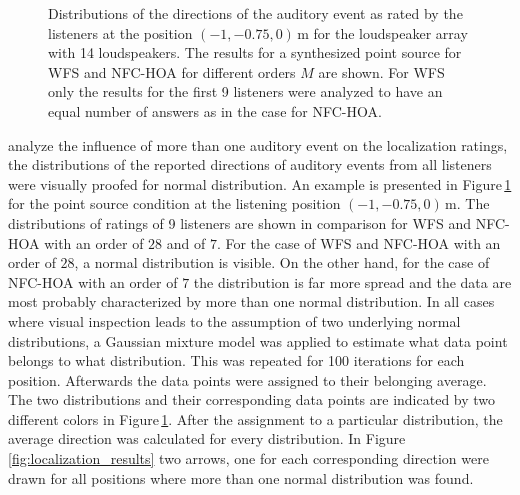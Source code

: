 \begin{figure}
    \small
    \centering
    
    \caption{Distributions of the directions of the auditory event as rated by
    the listeners at the position $(-1,-0.75,0)$\,m for the loudspeaker array with
    14 loudspeakers. The results for a synthesized point source for \ac{WFS} and
    \ac{NFC-HOA} for different orders $M$ are shown. For \ac{WFS} only the
    results for the first 9 listeners were analyzed to have an equal number of
    answers as in the case for \ac{NFC-HOA}.
    }
    \label{fig:localization_distribution}
\end{figure}
%
 analyze the influence of more than one auditory event on the
localization ratings, the distributions of the reported directions of auditory
events from all listeners were visually proofed for normal distribution. An
example is presented in Figure\,\ref{fig:localization_distribution} for the point
source condition at the listening position $(-1,-0.75,0)$\,m. The distributions
of ratings of 9 listeners are shown in comparison for \ac{WFS} and \ac{NFC-HOA}
with an order of $28$ and of $7$. For the case of \ac{WFS} and \ac{NFC-HOA} with an
order of $28$, a normal distribution is visible. On the other hand, for the case
of \ac{NFC-HOA} with an order of $7$ the distribution is far more spread and the
data are most probably characterized by more than one normal distribution. In all
cases where visual inspection leads to the assumption of two underlying normal
distributions, a Gaussian mixture model was applied to estimate what data point
belongs to what distribution. This was repeated for 100 iterations for each
position. Afterwards the data points were assigned to their belonging average.
The two distributions and their corresponding data points are
indicated by two different colors in
Figure\,\ref{fig:localization_distribution}. After the assignment to a particular
distribution, the average direction was calculated for every distribution. In
Figure\,\ref{fig:localization_results} two arrows, one for each corresponding
direction were drawn for all positions where more than one normal distribution
was found.

